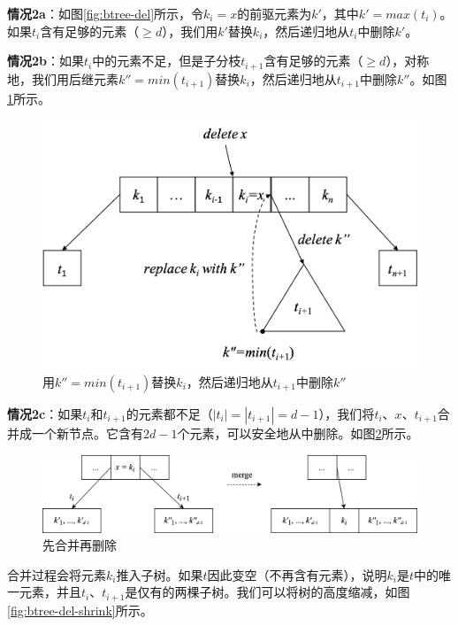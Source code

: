 \documentclass{ctexart}
\begin{document}
\textbf{情况2a}：如图\ref{fig:btree-del}所示，令$k_i = x$的前驱元素为$k'$，其中$k' = max(t_i)$。如果$t_i$含有足够的元素（$\geq d$），我们用$k'$替换$k_i$，然后递归地从$t_i$中删除$k'$。

\textbf{情况2b}：如果$t_i$中的元素不足，但是子分枝$t_{i+1}$含有足够的元素（$\geq d$），对称地，我们用后继元素$k'' = min(t_{i+1})$替换$k_i$，然后递归地从$t_{i+1}$中删除$k''$。如图\ref{fig:btree-del-case2b}所示。

\begin{figure}[htbp]
  \centering
  \includegraphics[scale=0.5]{img/btree-del-case2b.png}
  \caption{用$k'' = min(t_{i+1})$替换$k_i$，然后递归地从$t_{i+1}$中删除$k''$}
  \label{fig:btree-del-case2b}
\end{figure}

\textbf{情况2c}：如果$t_i$和$t_{i+1}$的元素都不足（$|t_i| = |t_{i+1}| = d - 1$），我们将$t_i$、$x$、$t_{i+1}$合并成一个新节点。它含有$2d - 1$个元素，可以安全地从中删除。如图\ref{fig:btree-del-merge}所示。

\begin{figure}[htbp]
  \centering
  \includegraphics[scale=0.65]{img/btree-del-merge.png}
  \caption{先合并再删除}
  \label{fig:btree-del-merge}
\end{figure}

合并过程会将元素$k_i$推入子树。如果$t$因此变空（不再含有元素），说明$k_i$是$t$中的唯一元素，并且$t_i$、$t_{i+1}$是仅有的两棵子树。我们可以将树的高度缩减，如图\ref{fig:btree-del-shrink}所示。
\end{document}
